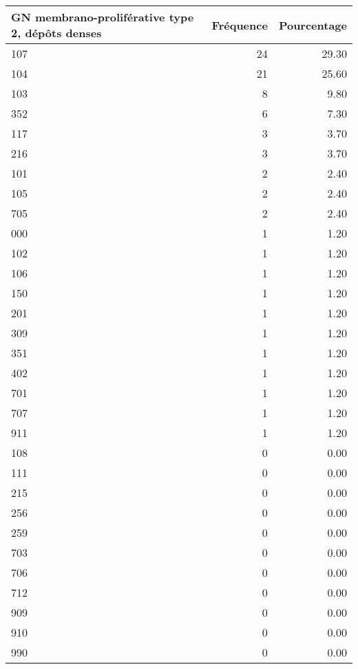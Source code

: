 \documentclass[11pt,a4paper]{article}\usepackage[]{graphicx}\usepackage[]{color}
\begin{document}
\begin{table}[H]
\centering
\begin{tabular}{lrr}
  \hline
GN membrano-proliférative type 2, dépôts denses & Fréquence & Pourcentage \\ 
  \hline
107 &  24 & 29.30 \\ 
  104 &  21 & 25.60 \\ 
  103 &   8 & 9.80 \\ 
  352 &   6 & 7.30 \\ 
  117 &   3 & 3.70 \\ 
  216 &   3 & 3.70 \\ 
  101 &   2 & 2.40 \\ 
  105 &   2 & 2.40 \\ 
  705 &   2 & 2.40 \\ 
  000 &   1 & 1.20 \\ 
  102 &   1 & 1.20 \\ 
  106 &   1 & 1.20 \\ 
  150 &   1 & 1.20 \\ 
  201 &   1 & 1.20 \\ 
  309 &   1 & 1.20 \\ 
  351 &   1 & 1.20 \\ 
  402 &   1 & 1.20 \\ 
  701 &   1 & 1.20 \\ 
  707 &   1 & 1.20 \\ 
  911 &   1 & 1.20 \\ 
  108 &   0 & 0.00 \\ 
  111 &   0 & 0.00 \\ 
  215 &   0 & 0.00 \\ 
  256 &   0 & 0.00 \\ 
  259 &   0 & 0.00 \\ 
  703 &   0 & 0.00 \\ 
  706 &   0 & 0.00 \\ 
  712 &   0 & 0.00 \\ 
  909 &   0 & 0.00 \\ 
  910 &   0 & 0.00 \\ 
  990 &   0 & 0.00 \\ 
   \hline
\end{tabular}
\end{table}
\end{document}
